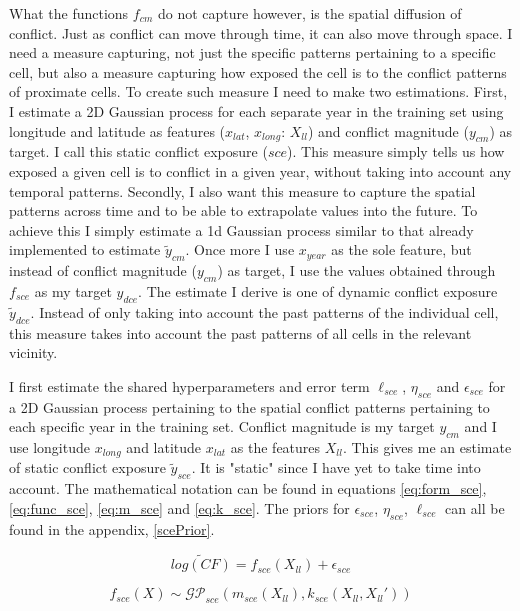 \documentclass[a4paper]{article}
\begin{document}
What the functions $f_{cm}$ do not capture however, is the spatial diffusion of conflict. Just as conflict can move through time, it can also move through space. I need a measure capturing, not just the specific patterns pertaining to a specific cell, but also a measure capturing how exposed the cell is to the conflict patterns of proximate cells. To create such measure I need to make two estimations. First, I estimate a 2D Gaussian process for each separate year in the training set using longitude and latitude as features ($x_{lat}$, $x_{long}$: $X_{ll}$) and conflict magnitude  ($y_{cm}$) as target. I call this static conflict exposure ($sce$). This measure simply tells us how exposed a given cell is to conflict in a given year, without taking into account any temporal patterns. Secondly, I also want this measure to capture the spatial patterns across time and to be able to extrapolate values into the future. To achieve this I simply estimate a 1d Gaussian process similar to that already implemented to estimate $\tilde{y}_{cm}$. Once more I use $x_{year}$ as the sole feature, but instead of conflict magnitude ($y_{cm}$) as target, I use the values obtained through $f_{sce}$ as my target $y_{dce}$. The estimate I derive is one of dynamic conflict exposure $\tilde{y}_{dce}$. Instead of only taking into account the past patterns of the individual cell, this measure takes into account the past patterns of all cells in the relevant vicinity.\par 

I first estimate the shared hyperparameters and error term $\ell_{sce}$, $\eta_{sce}$ and $\epsilon_{sce}$ for a 2D Gaussian process pertaining to the spatial conflict patterns pertaining to each specific year in the training set. Conflict magnitude is my target $y_{cm}$ and I use longitude $x_{long}$ and latitude $x_{lat}$ as the features $X_{ll}$. This gives me an estimate of static conflict exposure $\tilde{y}_{sce}$. It is "static" since I have yet to take time into account. The mathematical notation can be found in equations \ref{eq:form_sce}, \ref{eq:func_sce}, \ref{eq:m_sce} and \ref{eq:k_sce}.  The priors for $\epsilon_{sce}$, $\eta_{sce}$, $\ell_{sce}$ can all be found in the appendix, \autoref{scePrior}.\par

\[
\widetilde{log(CF)} = f_{sce}(X_{ll}) + \epsilon_{sce} \tag{23} \label{eq:form_sce}
\]

\[
f_{sce}(X) \sim \mathcal{GP}_{sce}(m_{sce}(X_{ll}),k_{sce}(X_{ll},X_{ll}')) \tag{24} \label{eq:func_sce}
\]
\end{document}
